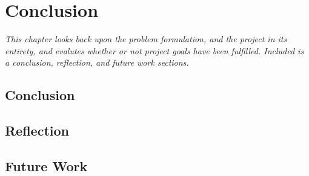 \chapter{Conclusion}

\textit{This chapter looks back upon the problem formulation, and the project in its entirety, and evalutes whether or not project goals have been fulfilled. Included is a conclusion, reflection, and future work sections.}

\section{Conclusion}
\label{ConclusionSec}

\section{Reflection}
\label{Reflection}

\section{Future Work}
\label{conclusion:FutureWork}
